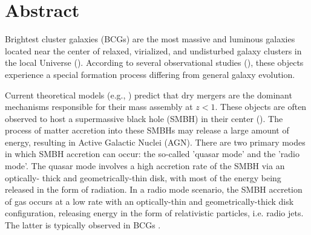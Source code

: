\chapter*{Abstract}

Brightest cluster galaxies (BCGs) are the most massive and luminous galaxies
located near the center of relaxed, virialized, and undisturbed galaxy clusters in the local Universe
(\cite{1976ApJ...205..688S, 2010MNRAS.404.1231V}). According to several observational studies
(\cite{2017MNRAS.467.4101G, 2020MNRAS.498.2719T}), these objects experience a special formation
process differing from general galaxy evolution.

Current theoretical models (e.g., \cite{2007MNRAS.375....2D, 2019ApJ...881..150C}) predict that dry
mergers are the dominant mechanisms responsible for their mass assembly at $z < 1$. These
objects are often observed to host a supermassive black hole (SMBH) in their center (\cite{2006ApJ...652..216R}).
The process of matter accretion into these SMBHs may release a large amount of
energy, resulting in Active Galactic Nuclei (AGN). There are two primary modes in which SMBH
accretion can occur: the so-called ’quasar mode’ and the ’radio mode’. The quasar mode involves
a high accretion rate of the SMBH via an optically- thick and geometrically-thin disk, with most of
the energy being released in the form of radiation. In a radio mode scenario, the SMBH accretion
of gas occurs at a low rate with an optically-thin and geometrically-thick disk configuration,
releasing energy in the form of relativistic particles, i.e. radio jets. The latter is typically observed in
BCGs \cite{2012MNRAS.422.2213S}.

